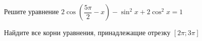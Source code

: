 \begin{ex}
	\begin{condition}
		\begin{enumcols}[label=\asbuk*)]
			\item Решите уравнение \( 2\cos{\left(\dfrac{5\pi}{2}-x\right)} - \sin^2 x + 2\cos^2 x = 1 \)
			\item Найдите все корни уравнения, принадлежащие отрезку \( \left[2\pi;3\pi\right] \)
		\end{enumcols}
	\end{condition}
\end{ex}